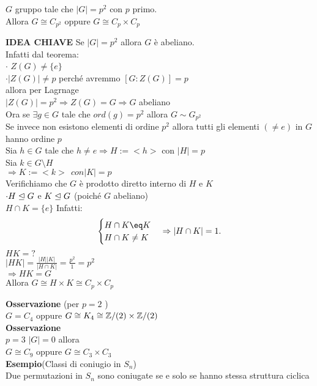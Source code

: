\documentclass[12px]{article}
\begin{document}
	\begin{coro}
		$G$ gruppo tale che $|G| = p^2$ con  $p$ primo.\\
		Allora $G\cong C_{p^2}$ oppure $G\cong C_p\times C_p$
	\end{coro}
	\begin{dimo}
		\textbf{IDEA CHIAVE} Se $|G| = p^2$ allora  $G$ è abeliano.\\
		Infatti dal teorema:\\
		$\cdot$ $Z(G)\neq\{e\}$\\
		$\cdot |Z(G)|\neq p$ perché avremmo $[G:Z(G)]=p$\\
		allora per Lagrnage\\
		$|Z(G)| = p^2 \Rightarrow Z(G) = G \Rightarrow  G$ abeliano\\
		Ora se $\exists g\in G$ tale che  $ord(g) = p^2$ allora  $G\sim G_{p^2}$\\
		Se invece non esistono elementi di ordine  $p^2$ allora tutti gli elementi  $(\neq e)$ in $G$ hanno ordine $p$\\
		Sia $h\in G$ tale che $h\neq e \Rightarrow H:=<h>$ con $|H| = p$\\
		Sia  $k\in G\setminus H$\\
		 $ \Rightarrow K := <k> \ \ con |K|  = p$ \\
		 Verifichiamo che $G$ è prodotto diretto interno di $H$ e $K$\\
		  $\cdot H\trianglelefteq G$ e $K\trianglelefteq G$ (poiché $G$ abeliano)\\
		  $H\cap K = \{e\}$ Infatti:\\
		 \[\begin{cases}
			H\cap K \eq K\\
			H\cap K\neq K
		\end{cases} \Rightarrow |H\cap K| = 1.\]
		$HK = ?$\\
		$|HK| = \frac{|H||K|}{|H\cap K|} = \frac{p^2}1 = p^2$\\
		 $ \Rightarrow HK = G$ \\
		 Allora $G\cong H\times K\cong C_p\times C_p$
		
	\end{dimo} 
	\textbf{Osservazione} (per $p = 2$ )\\
	$G = C_4$ oppure $G\cong K_4 \cong \mathbb{Z}/(2)\times\mathbb{Z}/(2)$\\
	 \textbf{Osservazione}\\
	 $p = 3$ $|G| = 0$ allora\\
	  $G\cong C_9$ oppure $G\cong C_3\times C_3$\\
	  \textbf{Esempio}(Classi di coniugio in $S_n$) \\
	  Due permutazioni in $S_n$ sono coniugate se e solo se hanno stessa struttura ciclica
	
\end{document}
